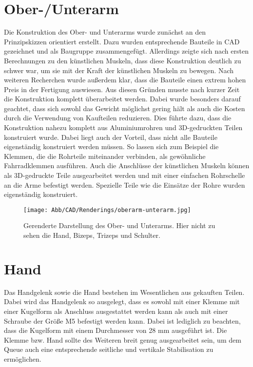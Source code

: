 	\section{Ober-/Unterarm}
		Die Konstruktion des Ober- und Unterarms wurde zunächst an den Prinzipskizzen orientiert erstellt.
		Dazu wurden entsprechende Bauteile in CAD gezeichnet und als Baugruppe zusammengefügt.
		Allerdings zeigte sich nach ersten Berechnungen zu den künstlichen Muskeln, dass diese Konstruktion deutlich zu schwer war, um sie mit der Kraft der künstlichen Muskeln zu bewegen.
		Nach weiteren Recherchen wurde außerdem klar, dass die Bauteile einen extrem hohen Preis in der Fertigung auswiesen.
		Aus diesen Gründen musste nach kurzer Zeit die Konstruktion komplett überarbeitet werden.
		Dabei wurde besonders darauf geachtet, dass sich sowohl das Gewicht möglichst gering hält als auch die Kosten durch die Verwendung von Kaufteilen reduzieren.
		Dies führte dazu, dass die Konstruktion nahezu komplett aus Aluminiumrohren und 3D-gedruckten Teilen konstruiert wurde.
		Dabei liegt auch der Vorteil, dass nicht alle Bauteile eigenständig konstruiert werden müssen.
		So lassen sich zum Beispiel die Klemmen, die die Rohrteile miteinander verbinden, als gewöhnliche Fahrradklemmen ausführen.
		Auch die Anschlüsse der künstlichen Muskeln können als 3D-gedruckte Teile ausgearbeitet werden und mit einer einfachen Rohrschelle an die Arme befestigt werden.
		Spezielle Teile wie die Einsätze der Rohre wurden eigenständig konstruiert.

		\begin{figure}[h]
			\centering
			\texttt{[image: Abb/CAD/Renderings/oberarm-unterarm.jpg]}
			\caption[Gerenderte Darstellung des Ober- und Unterarms]{Gerenderte Darstellung des Ober- und Unterarms. Hier nicht zu sehen die Hand, Bizeps, Trizeps und Schulter.}%
			\label{fig:rendering oberarm unterarm}
		\end{figure}

	\section{Hand}
		Das Handgelenk sowie die Hand bestehen im Wesentlichen aus gekauften Teilen.
		Dabei wird das Handgelenk so ausgelegt, dass es sowohl mit einer Klemme mit einer Kugelform als Anschluss ausgestattet werden kann als auch mit einer Schraube der Größe M5 befestigt werden kann.
		Dabei ist lediglich zu beachten, dass die Kugelform mit einem Durchmesser von 28 mm ausgeführt ist.
		Die Klemme bzw. Hand sollte des Weiteren breit genug ausgearbeitet sein, um dem Queue auch eine entsprechende seitliche und vertikale Stabilisation zu ermöglichen.


